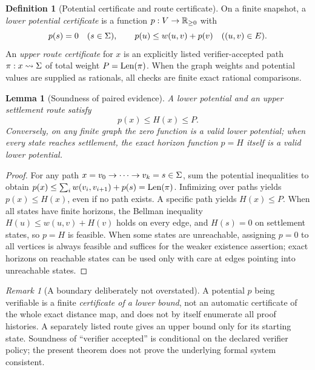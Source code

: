 \documentclass[11pt]{article}
\newtheorem{lemma}[theorem]{Lemma}
\theoremstyle{definition}\newtheorem{definition}[theorem]{Definition}\newtheorem{assumption}[theorem]{Assumption}
\theoremstyle{remark}\newtheorem{remark}[theorem]{Remark}
\begin{document}
\begin{definition}[Potential certificate and route certificate]\label{def:potential}
On a finite snapshot, a \emph{lower potential certificate} is a function $p:V\to\mathbb R_{\geq0}$ with
\[
p(s)=0\quad(s\in\Sigma),\qquad p(u)\leq w(u,v)+p(v)\quad((u,v)\in E).
\]
An \emph{upper route certificate} for $x$ is an explicitly listed verifier-accepted path $\pi:x\leadsto\Sigma$ of total weight $P=\operatorname{Len}(\pi)$. When the graph weights and potential values are supplied as rationals, all checks are finite exact rational comparisons.
\end{definition}
\begin{lemma}[Soundness of paired evidence]\label{lem:duality}
A lower potential and an upper settlement route satisfy
\[
\boxed{p(x)\leq H(x)\leq P.}
\]
Conversely, on any finite graph the zero function is a valid lower potential; when every state reaches settlement, the exact horizon function $p=H$ itself is a valid lower potential.
\end{lemma}
\begin{proof}
For any path $x=v_0\to\cdots\to v_k=s\in\Sigma$, sum the potential inequalities to obtain $p(x)\leq\sum_iw(v_i,v_{i+1})+p(s)=\operatorname{Len}(\pi)$. Infimizing over paths yields $p(x)\leq H(x)$, even if no path exists. A specific path yields $H(x)\leq P$. When all states have finite horizons, the Bellman inequality $H(u)\leq w(u,v)+H(v)$ holds on every edge, and $H(s)=0$ on settlement states, so $p=H$ is feasible. When some states are unreachable, assigning $p=0$ to all vertices is always feasible and suffices for the weaker existence assertion; exact horizons on reachable states can be used only with care at edges pointing into unreachable states.
\end{proof}
\par


\begin{remark}[A boundary deliberately not overstated]\label{rem:potential}
A potential $p$ being verifiable is a finite \emph{certificate of a lower bound}, not an automatic certificate of the whole exact distance map, and does not by itself enumerate all proof histories. A separately listed route gives an upper bound only for its starting state. Soundness of ``verifier accepted'' is conditional on the declared verifier policy; the present theorem does not prove the underlying formal system consistent.
\end{remark}
\end{document}
